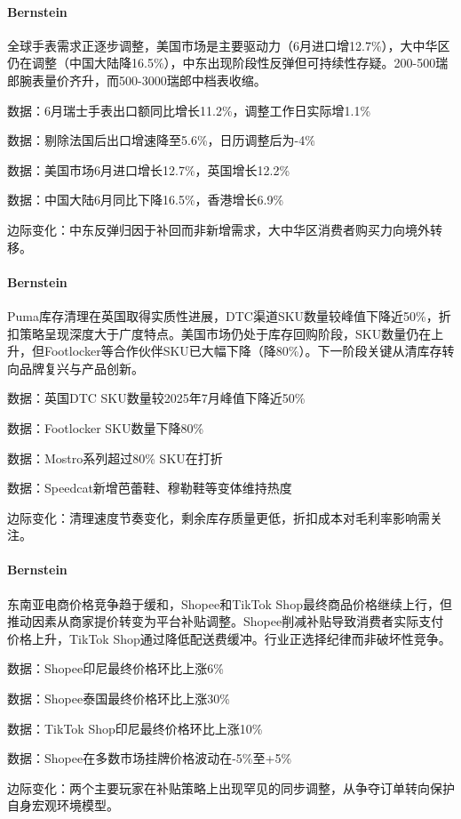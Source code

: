\documentclass[11pt]{ctexart}
\begin{document}
\paragraph{Bernstein} 全球手表需求正逐步调整，美国市场是主要驱动力（6月进口增12.7\%），大中华区仍在调整（中国大陆降16.5\%），中东出现阶段性反弹但可持续性存疑。200-500瑞郎腕表量价齐升，而500-3000瑞郎中档表收缩。
{\small\color{refgray}数据：6月瑞士手表出口额同比增长11.2\%，调整工作日实际增1.1\%\par}
{\small\color{refgray}数据：剔除法国后出口增速降至5.6\%，日历调整后为-4\%\par}
{\small\color{refgray}数据：美国市场6月进口增长12.7\%，英国增长12.2\%\par}
{\small\color{refgray}数据：中国大陆6月同比下降16.5\%，香港增长6.9\%\par}
{\small\color{refgray}边际变化：中东反弹归因于补回而非新增需求，大中华区消费者购买力向境外转移。\par}
\paragraph{Bernstein} Puma库存清理在英国取得实质性进展，DTC渠道SKU数量较峰值下降近50\%，折扣策略呈现深度大于广度特点。美国市场仍处于库存回购阶段，SKU数量仍在上升，但Footlocker等合作伙伴SKU已大幅下降（降80\%）。下一阶段关键从清库存转向品牌复兴与产品创新。
{\small\color{refgray}数据：英国DTC SKU数量较2025年7月峰值下降近50\%\par}
{\small\color{refgray}数据：Footlocker SKU数量下降80\%\par}
{\small\color{refgray}数据：Mostro系列超过80\% SKU在打折\par}
{\small\color{refgray}数据：Speedcat新增芭蕾鞋、穆勒鞋等变体维持热度\par}
{\small\color{refgray}边际变化：清理速度节奏变化，剩余库存质量更低，折扣成本对毛利率影响需关注。\par}
\paragraph{Bernstein} 东南亚电商价格竞争趋于缓和，Shopee和TikTok Shop最终商品价格继续上行，但推动因素从商家提价转变为平台补贴调整。Shopee削减补贴导致消费者实际支付价格上升，TikTok Shop通过降低配送费缓冲。行业正选择纪律而非破坏性竞争。
{\small\color{refgray}数据：Shopee印尼最终价格环比上涨6\%\par}
{\small\color{refgray}数据：Shopee泰国最终价格环比上涨30\%\par}
{\small\color{refgray}数据：TikTok Shop印尼最终价格环比上涨10\%\par}
{\small\color{refgray}数据：Shopee在多数市场挂牌价格波动在-5\%至+5\%\par}
{\small\color{refgray}边际变化：两个主要玩家在补贴策略上出现罕见的同步调整，从争夺订单转向保护自身宏观环境模型。\par}
\end{document}
